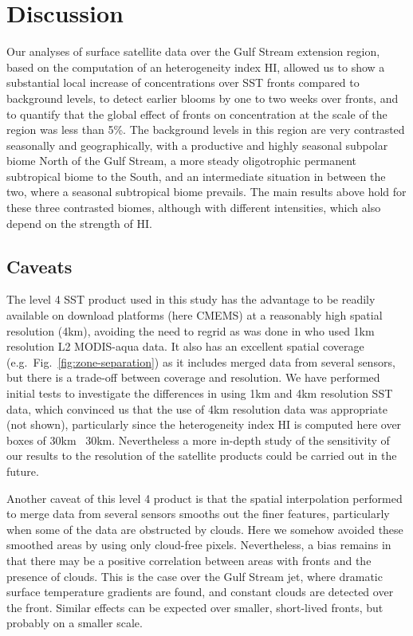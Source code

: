 \section{Discussion}

Our analyses of surface satellite data over the Gulf Stream extension region, based on the computation of an heterogeneity index HI, allowed us to show a substantial local increase of  concentrations over SST fronts compared to background levels, to detect earlier blooms by one to two weeks over fronts, and to quantify that the global effect of fronts on  concentration at the scale of the region was less than 5\%.
The background levels in this region are very contrasted seasonally and geographically, with a productive and highly seasonal subpolar biome North of the Gulf Stream, a more steady oligotrophic permanent subtropical biome to the South, and an intermediate situation in between the two, where a seasonal subtropical biome prevails.
The main results above hold for these three contrasted biomes, although with different intensities, which also depend on the strength of HI.\@

\subsection{Caveats}

The level 4 SST product used in this study has the advantage to be readily available on download platforms (here CMEMS) at a reasonably high spatial resolution (4km), avoiding the need to regrid as was done in \citet{liu_2016} who used 1km resolution L2 MODIS-aqua data.
It also has an excellent spatial coverage (e.g.\ Fig.~\ref{fig:zone-separation}) as it includes merged data from several sensors, but there is a trade-off between coverage and resolution.
We have performed initial tests to investigate the differences in using 1km and 4km resolution SST data, which convinced us that the use of 4km resolution data was appropriate (not shown), particularly since the heterogeneity index HI is computed here over boxes of 30km \texttimes\ 30km.
Nevertheless a more in-depth study of the sensitivity of our results to the resolution of the satellite products could be carried out in the future.

Another caveat of this level 4 product is that the spatial interpolation performed to merge data from several sensors smooths out the finer features, particularly when some of the data are obstructed by clouds.
Here we somehow avoided these smoothed areas by using only cloud-free  pixels.
Nevertheless, a bias remains in that there may be a positive correlation between areas with fronts and the presence of clouds.
This is the case over the Gulf Stream jet, where dramatic surface temperature gradients are found, and constant clouds are detected over the front.
Similar effects can be expected over smaller, short-lived fronts, but probably on a smaller scale.

